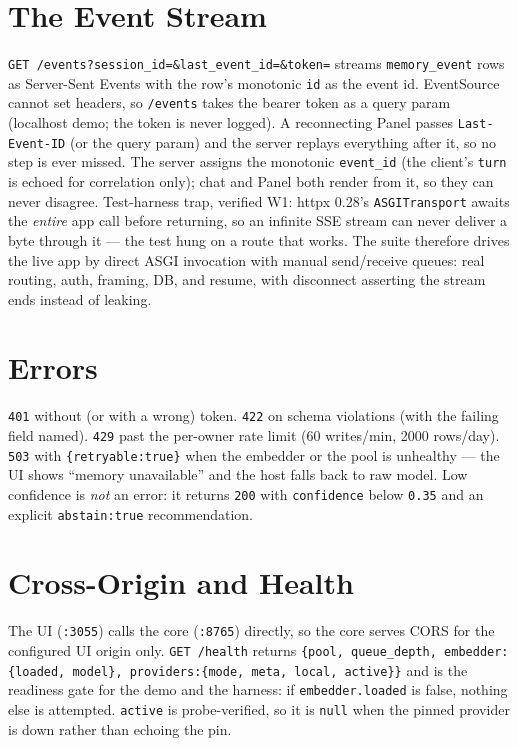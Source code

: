 \section{The Event Stream}
\texttt{GET /events?session\_id=\&last\_event\_id=\&token=} streams \texttt{memory\_event}
rows as Server-Sent Events with the row's monotonic \texttt{id} as the event id. EventSource
cannot set headers, so \texttt{/events} takes the bearer token as a query param (localhost demo;
the token is never logged). A reconnecting Panel passes \texttt{Last-Event-ID} (or the query
param) and the server replays everything after it, so no step is ever missed. The server assigns
the monotonic \texttt{event\_id} (the client's \texttt{turn} is echoed for correlation only);
chat and Panel both render from it, so they can never disagree. Test-harness trap, verified W1:
httpx 0.28's \texttt{ASGITransport} awaits the \emph{entire} app call before returning, so an
infinite SSE stream can never deliver a byte through it --- the test hung on a route that works.
The suite therefore drives the live app by direct ASGI invocation with manual send/receive
queues: real routing, auth, framing, DB, and resume, with disconnect asserting the stream ends
instead of leaking.

\section{Errors}
\texttt{401} without (or with a wrong) token. \texttt{422} on schema violations (with the
failing field named). \texttt{429} past the per-owner rate limit (60 writes/min, 2000
rows/day). \texttt{503} with \texttt{\{retryable:true\}} when the embedder or the pool is
unhealthy --- the UI shows ``memory unavailable'' and the host falls back to raw model.
Low confidence is \emph{not} an error: it returns \texttt{200} with
\texttt{confidence} below \texttt{0.35} and an explicit \texttt{abstain:true} recommendation.

\section{Cross-Origin and Health}
The UI (\texttt{:3055}) calls the core (\texttt{:8765}) directly, so the core serves CORS for
the configured UI origin only. \texttt{GET /health} returns
\texttt{\{pool, queue\_depth, embedder:\{loaded, model\}, providers:\{mode, meta, local, active\}\}}
and is the readiness gate for the demo and the harness: if \texttt{embedder.loaded} is false,
nothing else is attempted. \texttt{active} is probe-verified, so it is \texttt{null} when the
pinned provider is down rather than echoing the pin.
